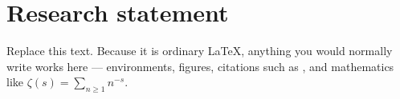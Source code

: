 %
%
%
%   
%

\section{Research statement}

Replace this text. Because it is ordinary LaTeX, anything you would normally
write works here --- environments, figures, citations such as
\cite{example-published}, and mathematics like $\zeta(s) = \sum_{n \ge 1} n^{-s}$.

